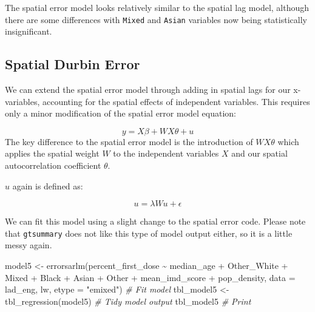 \documentclass[
]{book}
\newenvironment{Shaded}{\begin{snugshade}}{\end{snugshade}}
\newcommand{\AttributeTok}[1]{\textcolor[rgb]{0.77,0.63,0.00}{#1}}
\newcommand{\CommentTok}[1]{\textcolor[rgb]{0.56,0.35,0.01}{\textit{#1}}}
\newcommand{\FunctionTok}[1]{\textcolor[rgb]{0.00,0.00,0.00}{#1}}
\newcommand{\NormalTok}[1]{#1}
\newcommand{\OtherTok}[1]{\textcolor[rgb]{0.56,0.35,0.01}{#1}}
\newcommand{\SpecialCharTok}[1]{\textcolor[rgb]{0.00,0.00,0.00}{#1}}
\newcommand{\StringTok}[1]{\textcolor[rgb]{0.31,0.60,0.02}{#1}}
\begin{document}
The spatial error model looks relatively similar to the spatial lag model, although there are some differences with \texttt{Mixed} and \texttt{Asian} variables now being statistically insignificant.

\hypertarget{spatial-durbin-error}{%
\subsection{Spatial Durbin Error}\label{spatial-durbin-error}}

We can extend the spatial error model through adding in spatial lags for our x-variables, accounting for the spatial effects of independent variables. This requires only a minor modification of the spatial error model equation:

\[
y = X\beta + WX\theta + u
\]
The key difference to the spatial error model is the introduction of \(WX\theta\) which applies the spatial weight \(W\) to the independent variables \(X\) and our spatial autocorrelation coefficient \(\theta\).

\(u\) again is defined as:

\[
u = \lambda Wu + \epsilon
\]

We can fit this model using a slight change to the spatial error code. Please note that \texttt{gtsummary} does not like this type of model output either, so it is a little messy again.

\begin{Shaded}
\begin{Highlighting}[]
\NormalTok{model5 }\OtherTok{\textless{}{-}} \FunctionTok{errorsarlm}\NormalTok{(percent\_first\_dose }\SpecialCharTok{\textasciitilde{}}\NormalTok{ median\_age }\SpecialCharTok{+}\NormalTok{ Other\_White }\SpecialCharTok{+}\NormalTok{ Mixed }\SpecialCharTok{+}\NormalTok{ Black }\SpecialCharTok{+}\NormalTok{ Asian }\SpecialCharTok{+}\NormalTok{ Other }\SpecialCharTok{+}\NormalTok{ mean\_imd\_score }\SpecialCharTok{+}\NormalTok{ pop\_density, }\AttributeTok{data =}\NormalTok{ lad\_eng, lw, }\AttributeTok{etype =} \StringTok{"emixed"}\NormalTok{) }\CommentTok{\# Fit model}
\NormalTok{tbl\_model5 }\OtherTok{\textless{}{-}} \FunctionTok{tbl\_regression}\NormalTok{(model5) }\CommentTok{\# Tidy model output}
\NormalTok{tbl\_model5 }\CommentTok{\# Print}
\end{Highlighting}
\end{Shaded}
\end{document}
